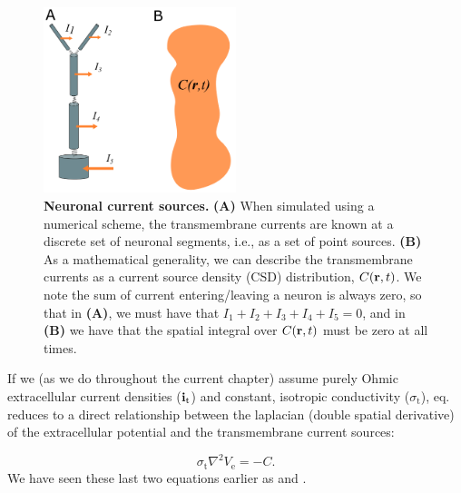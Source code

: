 \begin{figure}[!ht]
\begin{center}
\includegraphics[width=0.5\textwidth]{Figures/VC/CSD.png}
\end{center}
\caption{\textbf{Neuronal current sources.}  
{\bf (A)} When simulated using a numerical scheme, the transmembrane currents 
are known at a discrete set of neuronal segments, i.e., as a set of point sources.  
{\bf (B)} As a mathematical generality, we can describe the transmembrane currents 
as a current source density (CSD) distribution, $C({\bf r},t)$. 
We note the sum of current entering/leaving a neuron is always zero, 
so that in {\bf (A)}, we must have that $I_1 + I_2 + I_3 + I_4 + I_5= 0$, 
and in {\bf (B)} we have that the spatial integral over $C({\bf r},t)$ 
must be zero at all times.
}
\label{fig:VC:CSD}
\end{figure}

If we (as we do throughout the current chapter) assume purely Ohmic extracellular current densities (${\bf i}_\mathrm{t}$) 
and constant, isotropic conductivity ($\sigma_\mathrm{t}$), eq.  reduces to a direct relationship 
between the laplacian (double spatial derivative) of the extracellular potential and the transmembrane current sources: 

\begin{equation}
\sigma_\text{t} \nabla^2{V_\mathrm{e}} = -C.
\label{eq:VC:CSD3}
\end{equation}
We have seen these last two equations earlier as  and . 


